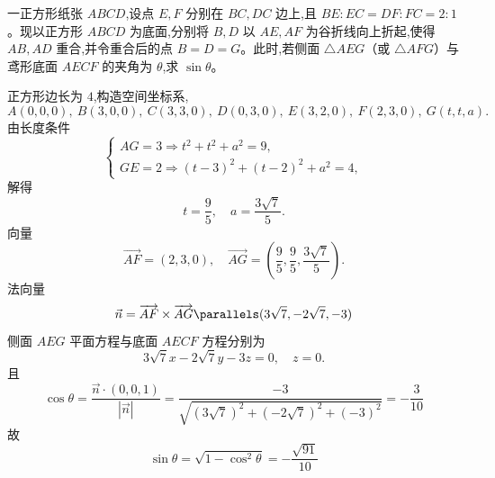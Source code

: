 \begin{questions}
    \question 一正方形纸张 $ABCD$,设点 $E, F$ 分别在 ${BC}, {DC}$ 边上,且 $BE:EC = DF:FC = 2:1$。现以正方形 $ABCD$ 为底面,分别将 $B,D$ 以 $AE, AF$ 为谷折线向上折起,使得 $AB, AD$ 重合,并令重合后的点 $B=D=G$。此时,若侧面 $\triangle AEG$（或 $\triangle AFG$）与鸢形底面 $AECF$ 的夹角为 $\theta$,求 $\sin \theta$。
    \begin{solution}
        正方形边长为 $4$,构造空间坐标系,
        $$A(0,0,0), \
        B(3,0,0), \
        C(3,3,0), \
        D(0,3,0), \
        E(3,2,0), \
        F(2,3,0), \
        G(t,t,a).$$
        由长度条件
        \[
        \begin{cases}
        AG = 3 \Rightarrow t^2 + t^2 + a^2 = 9, \\
        GE = 2 \Rightarrow (t-3)^2 + (t-2)^2 + a^2 = 4,
        \end{cases}
        \]
        解得
        \[
        t = \frac{9}{5}, \quad a = \frac{3\sqrt{7}}{5}.
        \]
        向量
        \[
        \overrightarrow{AF} = (2,3,0), \quad \overrightarrow{AG} = \left(\frac{9}{5}, \frac{9}{5}, \frac{3\sqrt{7}}{5}\right).
        \]
        法向量
        \[
        \vec{n} = \overrightarrow{AF} \times \overrightarrow{AG} \parallels (3\sqrt{7}, -2\sqrt{7}, -3)
        \]
        侧面 $AEG$ 平面方程与底面 $AECF$ 方程分别为
        \[
        3\sqrt{7} x - 2\sqrt{7} y - 3 z = 0, \quad z = 0.
        \]
        且
        \[
        \cos \theta = \frac{\vec{n} \cdot (0,0,1)}{|\vec{n}|} = \frac{-3}{\sqrt{(3\sqrt{7})^2 + (-2\sqrt{7})^2 + (-3)^2}} = -\frac{3}{10}
        \]
        故
        \[
        \sin \theta = \sqrt{1 - \cos^2 \theta} = -\frac{\sqrt{91}}{10}
        \]
    \end{solution}
    

\end{questions}
